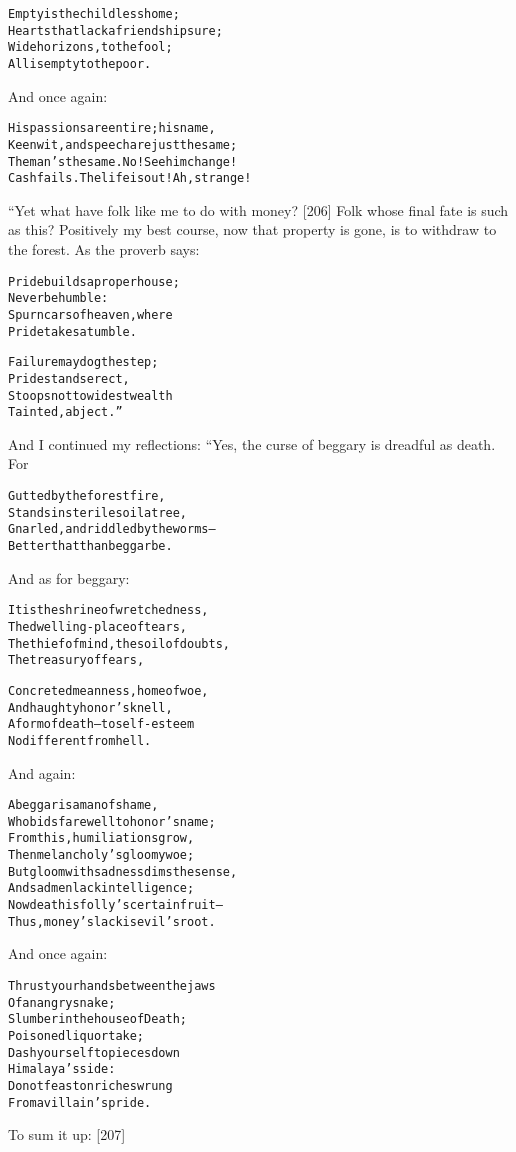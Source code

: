 \documentclass{article}
\renewenvironment{verbatim}{\begin{alltt}\normalfont\begin{centering}}{\end{centering}\end{alltt}}
\begin{document}
\begin{verbatim}
Empty is the childless home;
    Hearts that lack a friendship sure;
Wide horizons, to the fool;
    All is empty to the poor.
\end{verbatim}
And once again:

\begin{verbatim}
His passions are entire; his name,
Keen wit, and speech are just the same;
The man's the same. No! See him change!
Cash fails. The life is out! Ah, strange!
\end{verbatim}
“Yet what have folk like me to do with money? [206] Folk whose
final fate is such as this? Positively my best course, now that
property is gone, is to withdraw to the forest. As the proverb
says:

\begin{verbatim}
Pride builds a proper house;
    Never be humble:
Spurn cars of heaven, where
    Pride takes a tumble.

Failure may dog the step;
    Pride stands erect,
Stoops not to widest wealth
    Tainted, abject.”
\end{verbatim}
And I continued my reflections: “Yes, the curse of beggary is
dreadful as death. For

\begin{verbatim}
Gutted by the forest fire,
    Stands in sterile soil a tree,
Gnarled, and riddled by the worms--
    Better that than beggar be.
\end{verbatim}
And as for beggary:

\begin{verbatim}
It is the shrine of wretchedness,
    The dwelling-place of tears,
The thief of mind, the soil of doubts,
    The treasury of fears,

Concreted meanness, home of woe,
    And haughty honor's knell,
A form of death--to self-esteem
    No different from hell.
\end{verbatim}
And again:

\begin{verbatim}
A beggar is a man of shame,
Who bids farewell to honor's name;
From this, humiliations grow,
Then melancholy's gloomy woe;
But gloom with sadness dims the sense,
And sad men lack intelligence;
Now death is folly's certain fruit--
Thus, money's lack is evil's root.
\end{verbatim}
And once again:

\begin{verbatim}
Thrust your hands between the jaws
    Of an angry snake;
Slumber in the house of Death;
    Poisoned liquor take;
Dash yourself to pieces down
    Himalaya's side:
Do not feast on riches wrung
    From a villain's pride.
\end{verbatim}
To sum it up: [207]
\end{document}
